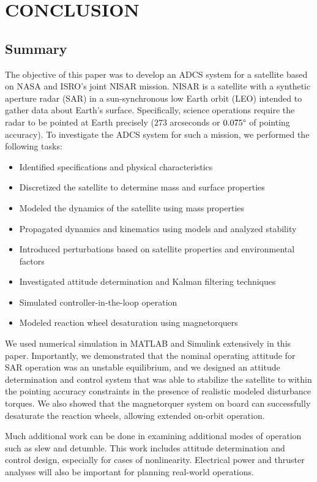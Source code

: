 \section{\Large CONCLUSION}

\subsection{Summary}
The objective of this paper was to develop an ADCS system for a satellite based on NASA and ISRO's joint NISAR mission. NISAR is a satellite with a synthetic aperture radar (SAR) in a sun-synchronous low Earth orbit (LEO) intended to gather data about Earth's surface. Specifically, science operations require the radar to be pointed at Earth precisely ($273$ arcseconds or $0.075 \degree$ of pointing accuracy). To investigate the ADCS system for such a mission, we performed the following tasks:
\begin{itemize}
  \item Identified specifications and physical characteristics
  \item Discretized the satellite to determine mass and surface properties
  \item Modeled the dynamics of the satellite using mass properties
  \item Propagated dynamics and kinematics using models and analyzed stability
  \item Introduced perturbations based on satellite properties and environmental factors
  \item Investigated attitude determination and Kalman filtering techniques
  \item Simulated controller-in-the-loop operation
  \item Modeled reaction wheel desaturation using magnetorquers
\end{itemize}
We used numerical simulation in MATLAB and Simulink extensively in this paper. Importantly, we demonstrated that the nominal operating attitude for SAR operation was an unstable equilibrium, and we designed an attitude determination and control system that was able to stabilize the satellite to within the pointing accuracy constraints in the presence of realistic modeled disturbance torques. We also showed that the magnetorquer system on board can successfully desaturate the reaction wheels, allowing extended on-orbit operation.

Much additional work can be done in examining additional modes of operation such as slew and detumble. This work includes attitude determination and control design, especially for cases of nonlinearity. Electrical power and thruster analyses will also be important for planning real-world operations.

